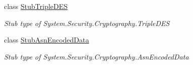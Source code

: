 \begin{DoxyCompactItemize}
class \hyperlink{class_system_1_1_security_1_1_cryptography_1_1_fakes_1_1_stub_triple_d_e_s}{Stub\-Triple\-D\-E\-S}
\begin{DoxyCompactList}\small\item\em Stub type of System.\-Security.\-Cryptography.\-Triple\-D\-E\-S\end{DoxyCompactList}\item 
class \hyperlink{class_system_1_1_security_1_1_cryptography_1_1_fakes_1_1_stub_asn_encoded_data}{Stub\-Asn\-Encoded\-Data}
\begin{DoxyCompactList}\small\item\em Stub type of System.\-Security.\-Cryptography.\-Asn\-Encoded\-Data\end{DoxyCompactList}\end{DoxyCompactItemize}
